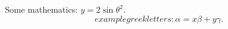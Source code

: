 \documentclass{article}
\begin{document}
Some mathematics: $y = 2 \sin \theta^{2}$.
\[
example greek letters : \alpha = x \beta + y \gamma .
\]
\end{document}
